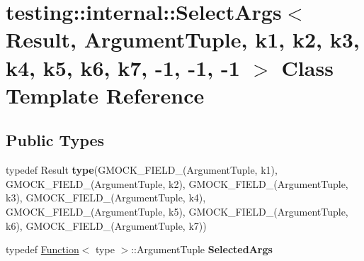 \hypertarget{classtesting_1_1internal_1_1_select_args_3_01_result_00_01_argument_tuple_00_01k1_00_01k2_00_01kf4b89906ed32c76471b80b75f77e1355}{}\section{testing\+:\+:internal\+:\+:Select\+Args$<$ Result, Argument\+Tuple, k1, k2, k3, k4, k5, k6, k7, -\/1, -\/1, -\/1 $>$ Class Template Reference}
\label{classtesting_1_1internal_1_1_select_args_3_01_result_00_01_argument_tuple_00_01k1_00_01k2_00_01kf4b89906ed32c76471b80b75f77e1355}
\subsection*{Public Types}
\begin{DoxyCompactItemize}
\item 
\mbox{\label{classtesting_1_1internal_1_1_select_args_3_01_result_00_01_argument_tuple_00_01k1_00_01k2_00_01kf4b89906ed32c76471b80b75f77e1355_a9a44113ab59893cfc38ae45451a5b654}} 
typedef Result {\bfseries type}(G\+M\+O\+C\+K\+\_\+\+F\+I\+E\+L\+D\+\_\+(Argument\+Tuple, k1), G\+M\+O\+C\+K\+\_\+\+F\+I\+E\+L\+D\+\_\+(Argument\+Tuple, k2), G\+M\+O\+C\+K\+\_\+\+F\+I\+E\+L\+D\+\_\+(Argument\+Tuple, k3), G\+M\+O\+C\+K\+\_\+\+F\+I\+E\+L\+D\+\_\+(Argument\+Tuple, k4), G\+M\+O\+C\+K\+\_\+\+F\+I\+E\+L\+D\+\_\+(Argument\+Tuple, k5), G\+M\+O\+C\+K\+\_\+\+F\+I\+E\+L\+D\+\_\+(Argument\+Tuple, k6), G\+M\+O\+C\+K\+\_\+\+F\+I\+E\+L\+D\+\_\+(Argument\+Tuple, k7))
\item 
\mbox{\label{classtesting_1_1internal_1_1_select_args_3_01_result_00_01_argument_tuple_00_01k1_00_01k2_00_01kf4b89906ed32c76471b80b75f77e1355_a128e1c494007a7bffd3d0a88a4dd7825}} 
typedef \hyperlink{structtesting_1_1internal_1_1_function}{Function}$<$ type $>$\+::Argument\+Tuple {\bfseries Selected\+Args}
\end{DoxyCompactItemize}
